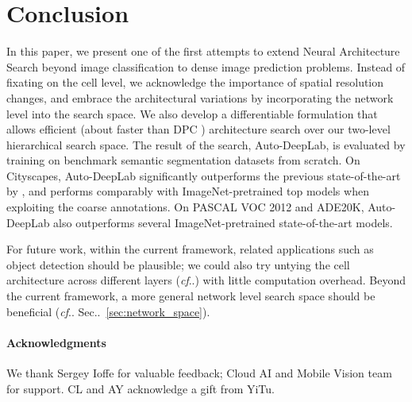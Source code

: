 \documentclass[10pt,twocolumn,letterpaper]{article}
\makeatletter
\def\@onedot{\ifx\@let@token.\else.\null\fi\xspace}
\DeclareRobustCommand\onedot{\futurelet\@let@token\@onedot}
\newcommand{\secref}[1]{Sec\onedot~\ref{#1}}
\def\cf{\emph{cf}\onedot} \def\Cf{\emph{Cf}\onedot}
\makeatother
\begin{document}
 \section{Conclusion}
\label{sec:conclusion}

In this paper, we present one of the first attempts to extend Neural Architecture Search beyond image classification to dense image prediction problems.
Instead of fixating on the cell level, we acknowledge the importance of spatial resolution changes, and embrace the architectural variations by incorporating the network level into the search space. 
We also develop a differentiable formulation that allows efficient (about  faster than DPC \cite{chen2018searching}) architecture search over our two-level hierarchical search space. 
The result of the search, Auto-DeepLab, is evaluated by training on benchmark semantic segmentation datasets from scratch.
On Cityscapes, Auto-DeepLab significantly outperforms the previous state-of-the-art by , and performs comparably with ImageNet-pretrained top models when exploiting the coarse annotations.
On PASCAL VOC 2012 and ADE20K, Auto-DeepLab also outperforms several ImageNet-pretrained state-of-the-art models.

For future work, within the current framework, related applications such as object detection should be plausible; we could also try untying the cell architecture  across different layers (\cf \cite{tan2018mnasnet}) with little computation overhead.
Beyond the current framework, a more general network level search space should be beneficial (\cf \secref{sec:network_space}).
 


\vspace{-0.5cm}
\ifcvprfinal
\paragraph{Acknowledgments}
We thank Sergey Ioffe for valuable feedback; Cloud AI and Mobile Vision team for support.
CL and AY acknowledge a gift from YiTu. 
\fi

{\small


}
\end{document}
